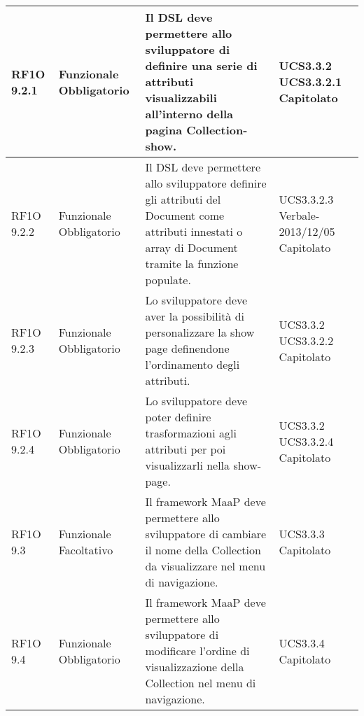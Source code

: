 \begin{center}
\begin{longtable}{ | l | p{2cm} | p{5cm} | p{1.7cm} |}
        RF1O 9.2.1  & Funzionale \newline  Obbligatorio  & Il DSL deve permettere allo sviluppatore di definire una serie di attributi visualizzabili all'interno della pagina Collection-show.
 &  UCS3.3.2 \newline  UCS3.3.2.1 \newline  Capitolato \newline  \\ \hline      
        RF1O 9.2.2  & Funzionale \newline  Obbligatorio  & Il DSL deve permettere allo sviluppatore definire gli attributi del Document come attributi innestati o array di Document tramite la funzione populate.
 &  UCS3.3.2.3 \newline  Verbale-2013/12/05 \newline  Capitolato \newline  \\ \hline      
        RF1O 9.2.3 & Funzionale \newline  Obbligatorio  & Lo sviluppatore deve aver la possibilità di personalizzare la show page definendone l'ordinamento degli attributi. &  UCS3.3.2 \newline  UCS3.3.2.2 \newline  Capitolato \newline  \\ \hline      
        RF1O 9.2.4 & Funzionale \newline  Obbligatorio  & Lo sviluppatore deve poter definire trasformazioni agli attributi per poi visualizzarli nella show-page. &  UCS3.3.2 \newline  UCS3.3.2.4 \newline  Capitolato \newline  \\ \hline      
        RF1O 9.3 & Funzionale \newline  Facoltativo  & Il framework MaaP deve permettere allo sviluppatore di cambiare il nome della Collection da visualizzare nel menu di navigazione. &  UCS3.3.3 \newline  Capitolato \newline  \\ \hline      
        RF1O 9.4 & Funzionale \newline  Obbligatorio  & Il framework MaaP deve permettere allo sviluppatore di modificare l'ordine di visualizzazione della Collection nel menu di navigazione. &  UCS3.3.4 \newline  Capitolato \newline  \\ \hline      

\end{longtable}
\end{center}
